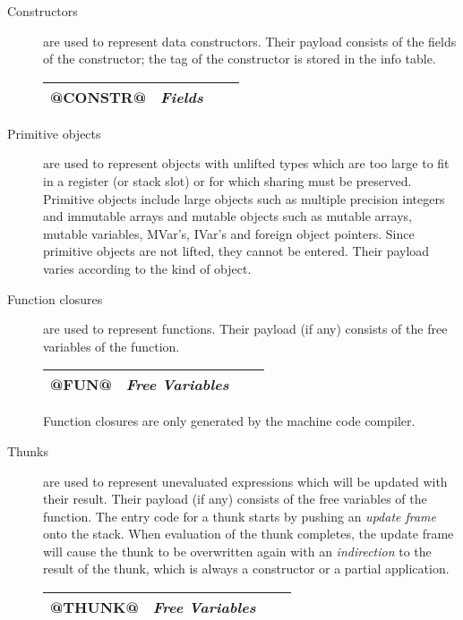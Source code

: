 \documentclass[11pt]{article}
\begin{document}
\begin{description}

\item[Constructors] are used to represent data constructors.  Their
payload consists of the fields of the constructor; the tag of the
constructor is stored in the info table.

\begin{center}
\begin{tabular}{|l|l|l|l|}\hline
@CONSTR@ & \emph{Fields} \\ \hline
\end{tabular}
\end{center}

\item[Primitive objects] are used to represent objects with unlifted
types which are too large to fit in a register (or stack slot) or for
which sharing must be preserved.  Primitive objects include large
objects such as multiple precision integers and immutable arrays and
mutable objects such as mutable arrays, mutable variables, MVar's,
IVar's and foreign object pointers.  Since primitive objects are not
lifted, they cannot be entered.  Their payload varies according to the
kind of object.

\item[Function closures] are used to represent functions.  Their
payload (if any) consists of the free variables of the function.

\begin{center}
\begin{tabular}{|l|l|l|l|}\hline
@FUN@ & \emph{Free Variables} \\ \hline
\end{tabular}
\end{center}

Function closures are only generated by the machine code compiler.

\item[Thunks] are used to represent unevaluated expressions which will
be updated with their result.  Their payload (if any) consists of the
free variables of the function.  The entry code for a thunk starts by
pushing an \emph{update frame} onto the stack.  When evaluation of the
thunk completes, the update frame will cause the thunk to be
overwritten again with an \emph{indirection} to the result of the
thunk, which is always a constructor or a partial application.

\begin{center}
\begin{tabular}{|l|l|l|l|}\hline
@THUNK@ & \emph{Free Variables} \\ \hline
\end{tabular}
\end{center}


\end{description}
\end{document}

